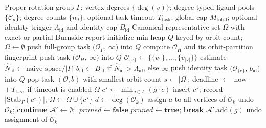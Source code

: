 \documentclass[pdflatex,sn-mathphys-num]{sn-jnl}
\theoremstyle{thmstyleone}%
\begin{document}
\begin{algorithm}
\caption{Subgroup Lattice Descent}
\label{alg:enum}
\footnotesize
\begin{algorithmic}[1]
\Require Proper-rotation group $\Gamma$; vertex degrees $\{\deg(v)\}$; degree-typed ligand pools $\{\mathcal{C}_d\}$; degree counts $\{n_d\}$; optional task timeout $T_{\mathrm{task}}$; global cap $M_{\mathrm{total}}$; optional identity trigger $\Lambda_{\mathrm{id}}$ and identity cap $B_{\mathrm{id}}$
\Ensure Canonical representative set $\Omega$ with exact or partial Burnside report
\State initialize min-heap $Q$ keyed by orbit count; $\Omega \gets \emptyset$
\State push full-group task $\big(\mathcal{O}_{\Gamma},\,\infty\big)$ into $Q$
    \State compute $\mathcal{O}_H$ and its orbit-partition fingerprint
        \State push task $\big(\mathcal{O}_H,\,\infty\big)$ into $Q$
    \EndIf
\EndFor
\State $\mathcal{O}_{\{e\}} \gets \big\{\{v_1\},\dots,\{v_{|V|}\}\big\}$
\State estimate $\widehat{N}_{\mathrm{id}} \gets \text{naive-space} / |\Gamma|$
\State $b_{\mathrm{id}} \gets B_{\mathrm{id}}$ if $\widehat{N}_{\mathrm{id}} > \Lambda_{\mathrm{id}}$, else $\infty$
\State push identity task $\big(\mathcal{O}_{\{e\}},\,b_{\mathrm{id}}\big)$ into $Q$
    \State pop task $(\mathcal{O}, b)$ with smallest orbit count
    \State $s \gets |\Omega|$; deadline $\gets$ now $+\,T_{\mathrm{task}}$ if timeout is enabled
    \State {}
\EndWhile
\State {} 
\State \Return $\Omega$
\Statex
{}
        \State \Return
    \EndIf
        \State $c^{\star} \gets \min_{g \in \Gamma} (g \cdot c)$
            \State insert $c^{\star}$; record $|\mathrm{Stab}_{\Gamma}(c^{\star})|$; $\Omega \gets \Omega \cup \{c^{\star}\}$
        \EndIf
        \State \Return
    \EndIf
    \State $d \gets \deg(\mathcal{O}_k)$
        \State assign $a$ to all vertices of $\mathcal{O}_k$
            \State undo $\mathcal{O}_k$; \textbf{continue}
        \EndIf
        \State $\mathcal{A}' \gets \emptyset$; $\;pruned \gets \textbf{false}$
                \State $pruned \gets \textbf{true}$; \textbf{break}
                \State $\mathcal{A}'.\text{add}(g)$
            \EndIf
        \EndFor
            \State {}
        \EndIf
        \State undo assignment of $\mathcal{O}_k$
    \EndFor
\EndFunction
\end{algorithmic}
\end{algorithm}
\end{document}
